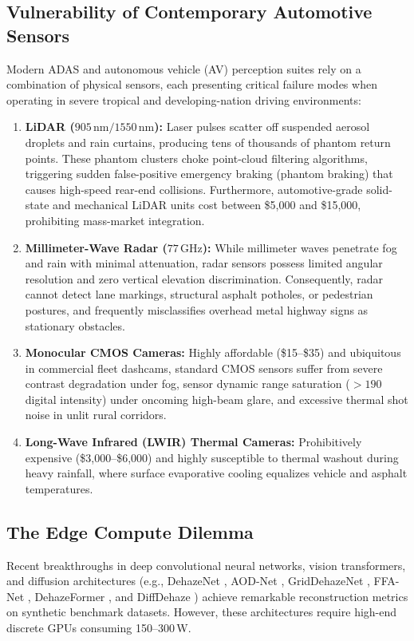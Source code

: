 \documentclass[conference]{IEEEtran}
\begin{document}
\subsection{Vulnerability of Contemporary Automotive Sensors}
Modern ADAS and autonomous vehicle (AV) perception suites rely on a combination of physical sensors, each presenting critical failure modes when operating in severe tropical and developing-nation driving environments:
\begin{enumerate}
    \item \textbf{LiDAR ($905\,\text{nm} / 1550\,\text{nm}$):} Laser pulses scatter off suspended aerosol droplets and rain curtains, producing tens of thousands of phantom return points. These phantom clusters choke point-cloud filtering algorithms, triggering sudden false-positive emergency braking (phantom braking) that causes high-speed rear-end collisions. Furthermore, automotive-grade solid-state and mechanical LiDAR units cost between \$5,000 and \$15,000, prohibiting mass-market integration.
    \item \textbf{Millimeter-Wave Radar ($77\,\text{GHz}$):} While millimeter waves penetrate fog and rain with minimal attenuation, radar sensors possess limited angular resolution and zero vertical elevation discrimination. Consequently, radar cannot detect lane markings, structural asphalt potholes, or pedestrian postures, and frequently misclassifies overhead metal highway signs as stationary obstacles.
    \item \textbf{Monocular CMOS Cameras:} Highly affordable (\$15--\$35) and ubiquitous in commercial fleet dashcams, standard CMOS sensors suffer from severe contrast degradation under fog, sensor dynamic range saturation ($>190$ digital intensity) under oncoming high-beam glare, and excessive thermal shot noise in unlit rural corridors.
    \item \textbf{Long-Wave Infrared (LWIR) Thermal Cameras:} Prohibitively expensive (\$3,000--\$6,000) and highly susceptible to thermal washout during heavy rainfall, where surface evaporative cooling equalizes vehicle and asphalt temperatures.
\end{enumerate}

\subsection{The Edge Compute Dilemma}
Recent breakthroughs in deep convolutional neural networks, vision transformers, and diffusion architectures (e.g., DehazeNet \cite{cai2016dehazenet}, AOD-Net \cite{li2017aodnet}, GridDehazeNet \cite{liu2019griddehazenet}, FFA-Net \cite{qin2020ffa}, DehazeFormer \cite{guo2022dehazeformer}, and DiffDehaze \cite{song2024diffdehaze}) achieve remarkable reconstruction metrics on synthetic benchmark datasets. However, these architectures require high-end discrete GPUs consuming 150--300\,W.
\end{document}
